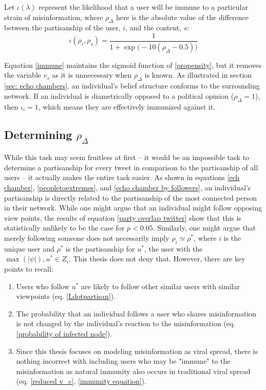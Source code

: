 \documentclass[preprint,review,12pt]{elsarticle}
\begin{document}
Let $\iota(\lambda)$ represent the likelihood that a user will be immune to a particular strain of misinformation, where $\rho_{\Delta}$ here is the absolute value of the difference between the partisanship of the user, $i$, and the content, $s$:
\begin{equation}
\label{immunity equation}
    \iota(\rho_i,\rho_s)=\frac{1}{1+\exp{\big(-10 (\rho_{\Delta}-0.5)\big)}}
\end{equation}

Equation \ref{immune} maintains the sigmoid function of \ref{propensity}, but it removes the variable $v_s$ as it is unnecessary when $\rho_{\Delta}$ is known. As illustrated in section \ref{sec: echo chambers}, an individual's belief structure conforms to the surrounding network. If an individual is diametrically opposed to a political opinion ($\rho_{\Delta} = 1$), then $\iota_i = 1$, which means they are effectively immunized against it. 



\subsection{Determining $\rho_{\Delta}$}
While this task may seem fruitless at first -- it would be an impossible task to determine a partisanship for every tweet in comparison to the partisanship of all users -- it actually makes the entire task easier. As shown in equations \ref{ech chamber}, \ref{peopletoextremes}, and \ref{echo chamber by followers}, an individual's partisanship is directly related to the partisanship of the most connected person in their network. While one might argue that an individual might follow opposing view points, the results of equation \ref{party overlap twitter} show that this is statistically unlikely to be the case for $p < 0.05$. Similarly, one might argue that merely following someone does not necessarily imply $\rho_i \simeq \rho^*$, where $i$ is the unique user and $\rho^*$ is the partisanship for $u^*$, the user with the $\max(|\psi|), u^* \in Z_i$. This thesis does not deny that. However, there are key points to recall:
\begin{enumerate}
    \item Users who follow $u^*$ are likely to follow other similar users with similar viewpoints (eq. \ref{Ldotpartisan}).
    \item The probability that an individual follows a user who shares misinformation is not changed by the individual's reaction to the misinformation (eq. \ref{probability of infected node}).
    \item Since this thesis focuses on modeling misinformation as viral spread, there is nothing incorrect with including users who may be "immune" to the misinformation as natural immunity also occurs in traditional viral spread (eq. \ref{reduced v_c}, \ref{immunity equation}).
\end{enumerate}
\end{document}
